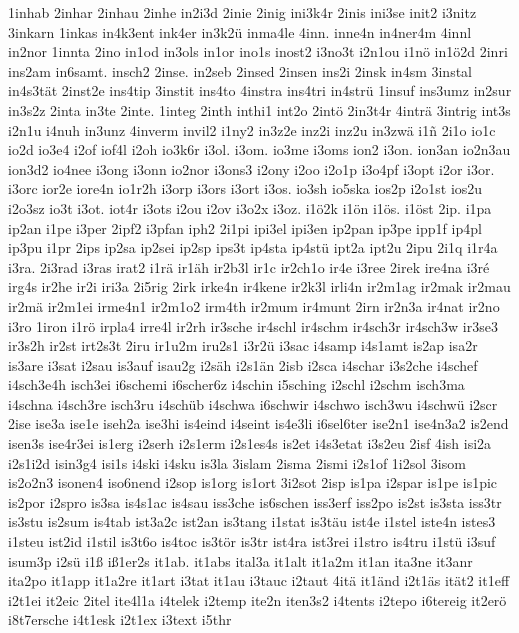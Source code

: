 {1inhab
2inhar
2inhau
2inhe
in2i3d
2inie
2inig
ini3k4r
2inis
ini3se
init2
i3nitz
3inkarn
1inkas
in4k3ent
ink4er
in3k2ü
inma4le
4inn.
inne4n
in4ner4m
4innl
in2nor
1innta
2ino
in1od
in3ols
in1or
ino1s
inost2
i3no3t
i2n1ou
i1nö
in1ö2d
2inri
ins2am
in6samt.
insch2
2inse.
in2seb
2insed
2insen
ins2i
2insk
in4sm
3instal
in4s3tät
2inst2e
ins4tip
3instit
ins4to
4instra
ins4tri
in4strü
1insuf
ins3umz
in2sur
in3s2z
2inta
in3te
2inte.
1integ
2inth
inthi1
int2o
2intö
2in3t4r
4inträ
3intrig
int3s
i2n1u
i4nuh
in3unz
4inverm
invil2
i1ny2
in3z2e
inz2i
inz2u
in3zwä
i1ñ
2i1o
io1c
io2d
io3e4
i2of
iof4l
i2oh
io3k6r
i3ol.
i3om.
io3me
i3oms
ion2
i3on.
ion3an
io2n3au
ion3d2
io4nee
i3ong
i3onn
io2nor
i3ons3
i2ony
i2oo
i2o1p
i3o4pf
i3opt
i2or
i3or.
i3orc
ior2e
iore4n
io1r2h
i3orp
i3ors
i3ort
i3os.
io3sh
io5ska
ios2p
i2o1st
ios2u
i2o3sz
io3t
i3ot.
iot4r
i3ots
i2ou
i2ov
i3o2x
i3oz.
i1ö2k
i1ön
i1ös.
i1öst
2ip.
i1pa
ip2an
i1pe
i3per
2ipf2
i3pfan
iph2
2i1pi
ipi3el
ipi3en
ip2pan
ip3pe
ipp1f
ip4pl
ip3pu
i1pr
2ips
ip2sa
ip2sei
ip2sp
ips3t
ip4sta
ip4stü
ipt2a
ipt2u
2ipu
2i1q
i1r4a
i3ra.
2i3rad
i3ras
irat2
i1rä
ir1äh
ir2b3l
ir1c
ir2ch1o
ir4e
i3ree
2irek
ire4na
i3ré
irg4s
ir2he
ir2i
iri3a
2i5rig
2irk
irke4n
ir4kene
ir2k3l
irli4n
ir2m1ag
ir2mak
ir2mau
ir2mä
ir2m1ei
irme4n1
ir2m1o2
irm4th
ir2mum
ir4munt
2irn
ir2n3a
ir4nat
ir2no
i3ro
1iron
i1rö
irpla4
irre4l
ir2rh
ir3sche
ir4schl
ir4schm
ir4sch3r
ir4sch3w
ir3se3
ir3s2h
ir2st
irt2s3t
2iru
ir1u2m
iru2s1
i3r2ü
i3sac
i4samp
i4s1amt
is2ap
isa2r
is3are
i3sat
i2sau
is3auf
isau2g
i2säh
i2s1än
2isb
i2sca
i4schar
i3s2che
i4schef
i4sch3e4h
isch3ei
i6schemi
i6scher6z
i4schin
i5sching
i2schl
i2schm
isch3ma
i4schna
i4sch3re
isch3ru
i4schüb
i4schwa
i6schwir
i4schwo
isch3wu
i4schwü
i2scr
2ise
ise3a
ise1e
iseh2a
ise3hi
is4eind
i4seint
is4e3li
i6sel6ter
ise2n1
ise4n3a2
is2end
isen3s
ise4r3ei
is1erg
i2serh
i2s1erm
i2s1es4s
is2et
i4s3etat
i3s2eu
2isf
4ish
isi2a
i2s1i2d
isin3g4
isi1s
i4ski
i4sku
is3la
3islam
2isma
2ismi
i2s1of
1i2sol
3isom
is2o2n3
isonen4
iso6nend
i2sop
is1org
is1ort
3i2sot
2isp
is1pa
i2spar
is1pe
is1pic
is2por
i2spro
is3sa
is4s1ac
is4sau
iss3che
is6schen
iss3erf
iss2po
is2st
is3sta
iss3tr
is3stu
is2sum
is4tab
ist3a2c
ist2an
is3tang
i1stat
is3täu
ist4e
i1stel
iste4n
istes3
i1steu
ist2id
i1stil
is3t6o
is4toc
is3tör
is3tr
ist4ra
ist3rei
i1stro
is4tru
i1stü
i3suf
isum3p
i2sü
i1ß
iß1er2s
it1ab.
it1abs
ital3a
it1alt
it1a2m
it1an
ita3ne
it3anr
ita2po
it1app
it1a2re
it1art
i3tat
it1au
i3tauc
i2taut
4itä
it1änd
i2t1äs
ität2
it1eff
i2t1ei
it2eic
2itel
ite4l1a
i4telek
i2temp
ite2n
iten3s2
i4tents
i2tepo
i6tereig
it2erö
i8t7ersche
i4t1esk
i2t1ex
i3text
i5thr
}
